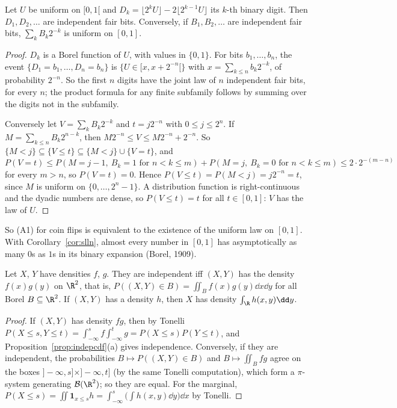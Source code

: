 \begin{proposition}\label{prop:digits}
Let $U$ be uniform on $[0,1[$ and $D_k=\lfloor2^kU\rfloor-2\lfloor2^{k-1}U\rfloor$ its $k$-th binary digit. Then $D_1,D_2,\ldots$ are independent fair bits.
Conversely, if $B_1,B_2,\ldots$ are independent fair bits, $\sum_kB_k2^{-k}$ is uniform on $[0,1]$.
\end{proposition}
\begin{proof}
$D_k$ is a Borel function of $U$, with values in $\{0,1\}$. For bits $b_1,\dots,b_n$, the event $\{D_1=b_1,\dots,D_n=b_n\}$ is $\{U\in[x,x+2^{-n}[\}$
with $x=\sum_{k\le n}b_k2^{-k}$, of probability $2^{-n}$. So the first $n$ digits have the joint law of $n$ independent fair bits, for every $n$; the
product formula for any finite subfamily follows by summing over the digits not in the subfamily.

Conversely let $V=\sum_kB_k2^{-k}$ and $t=j2^{-n}$ with $0\le j\le2^n$. If $M=\sum_{k\le n}B_k2^{n-k}$, then $M2^{-n}\le V\le M2^{-n}+2^{-n}$. So $\{M<j\}\subseteq\{V\le t\}\subseteq\{M<j\}\cup\{V=t\}$,
and $P(V=t)\le P(M=j-1,\ B_k=1\text{ for }n<k\le m)+P(M=j,\ B_k=0\text{ for }n<k\le m)\le2\cdot2^{-(m-n)}$ for every $m>n$, so $P(V=t)=0$.
Hence $P(V\le t)=P(M<j)=j2^{-n}=t$, since $M$ is uniform on $\{0,\dots,2^n-1\}$. A distribution function is right-continuous and the dyadic numbers
are dense, so $P(V\le t)=t$ for all $t\in[0,1]$: $V$ has the law of $U$.
\end{proof}

So (A1) for coin flips is equivalent to the existence of the uniform law on $[0,1]$. With Corollary~\ref{cor:slln}, almost every number
in $[0,1]$ has asymptotically as many $0$s as $1$s in its binary expansion (Borel, 1909).

\begin{proposition}\label{prop:joint}
Let $X$, $Y$ have densities $f$, $g$. They are independent iff $(X,Y)$ has the density $f(x)g(y)$ on $\R^2$, that is,
$P((X,Y)\in B)=\iint_Bf(x)g(y)\dd x\dd y$ for all Borel $B\subseteq\R^2$. If $(X,Y)$ has a density $h$, then $X$ has density $\int_\R h(x,y)\dd y$.
\end{proposition}
\begin{proof}
If $(X,Y)$ has density $fg$, then by Tonelli $P(X\le s,Y\le t)=\int_{-\infty}^sf\int_{-\infty}^tg=P(X\le s)P(Y\le t)$, and Proposition~\ref{prop:indepcdf}(a)
gives independence. Conversely, if they are independent, the probabilities $B\mapsto P((X,Y)\in B)$ and $B\mapsto\iint_Bfg$ agree on the
boxes $]-\infty,s]\times]-\infty,t]$ (by the same Tonelli computation), which form a $\pi$-system generating $\mathcal B(\R^2)$; so they are equal.
For the marginal, $P(X\le s)=\iint\mathbf 1_{x\le s}h=\int_{-\infty}^s\bigl(\int h(x,y)\dd y\bigr)\dd x$ by Tonelli.
\end{proof}

